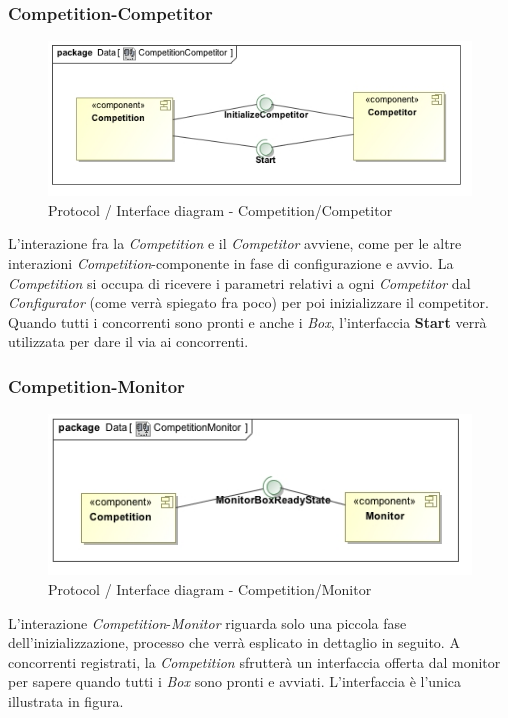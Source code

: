 \subsubsection{Competition-Competitor}
\begin{center}
\begin{figure}[h!]
	\includegraphics[scale=0.55]{img/InteractionDiagram/Implementation_Diagram__CompetitionCompetitor.jpg}
\caption{Protocol / Interface diagram - Competition/Competitor}
\end{figure}
\end{center}
L'interazione fra la \emph{Competition} e il \emph{Competitor} avviene, come per le altre interazioni \emph{Competition}-componente in fase di configurazione
e avvio. La \emph{Competition} si occupa di ricevere i parametri relativi a ogni \emph{Competitor} dal \emph{Configurator} (come verr\`{a} spiegato fra poco) per 
poi inizializzare il competitor. Quando tutti i concorrenti sono pronti e anche i \emph{Box}, l'interfaccia \textbf{Start} verr\`{a} utilizzata per dare il
via ai concorrenti.
\subsubsection{Competition-Monitor}
\begin{center}
\begin{figure}[h!]
	\includegraphics[scale=0.55]{img/InteractionDiagram/Implementation_Diagram__CompetitionMonitor.jpg}
\caption{Protocol / Interface diagram - Competition/Monitor}
\end{figure}
\end{center}
L'interazione \emph{Competition}-\emph{Monitor} riguarda solo una piccola fase dell'inizializzazione, processo che verr\`{a} esplicato in dettaglio in seguito.
A concorrenti registrati, la \emph{Competition} sfrutter\`{a} un interfaccia offerta dal monitor per sapere quando tutti i \emph{Box} sono pronti e avviati.
L'interfaccia \`{e} l'unica illustrata in figura.
\clearpage
